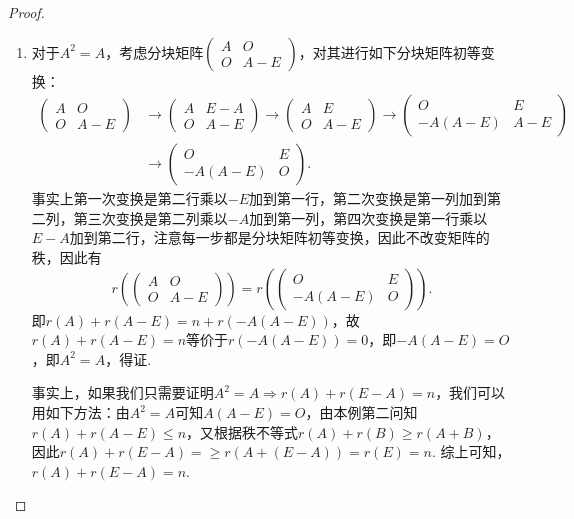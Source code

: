 \begin{proof}
\begin{enumerate}
        \item 对于$A^2=A$，考虑分块矩阵$\begin{pmatrix}
            A & O \\ O & A-E
        \end{pmatrix}$，对其进行如下分块矩阵初等变换：
        \begin{align*}
            \begin{pmatrix}
                A & O \\ O & A-E
            \end{pmatrix}&\to\begin{pmatrix}
                A & E-A \\ O & A-E
            \end{pmatrix}
            \to\begin{pmatrix}
                A & E \\ O & A-E
            \end{pmatrix}
            \to\begin{pmatrix}
                O & E \\ -A(A-E) & A-E
            \end{pmatrix}\\
            &\to\begin{pmatrix}
                O & E \\ -A(A-E) & O
            \end{pmatrix}.
        \end{align*}
        事实上第一次变换是第二行乘以$-E$加到第一行，第二次变换是第一列加到第二列，第三次变换是第二列乘以$-A$加到第一列，第四次变换是第一行乘以$E-A$加到第二行，注意每一步都是分块矩阵初等变换，因此不改变矩阵的秩，因此有
        \[r(\begin{pmatrix}
                A & O \\ O & A-E
            \end{pmatrix})=r(\begin{pmatrix}
                O & E \\ -A(A-E) & O
            \end{pmatrix}).\]
        即$r(A)+r(A-E)=n+r(-A(A-E))$，故$r(A)+r(A-E)=n$等价于$r(-A(A-E))=0$，即$-A(A-E)=O$，即$A^2=A$，得证.

        事实上，如果我们只需要证明$A^2=A\Rightarrow r(A)+r(E-A)=n$，我们可以用如下方法：由$A^2=A$可知$A(A-E)=O$，由本例第二问知$r(A)+r(A-E)\leqslant n$，又根据秩不等式$r(A)+r(B)\geqslant r(A+B)$，因此$r(A)+r(E-A)=\geqslant r(A+(E-A))=r(E)=n$. 综上可知，$r(A)+r(E-A)=n$.
    \end{enumerate}
\end{proof}

